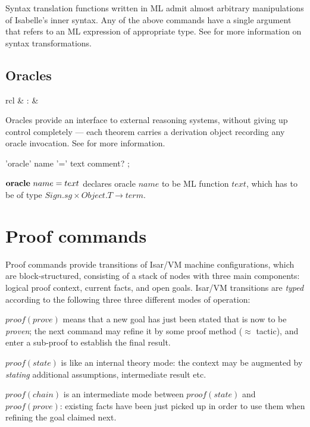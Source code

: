 Syntax translation functions written in ML admit almost arbitrary
manipulations of Isabelle's inner syntax.  Any of the above commands have a
single  argument that refers to an ML expression of
appropriate type.  See \cite[\S8]{isabelle-ref} for more information on syntax
transformations.


\subsection{Oracles}

\begin{matharray}{rcl}
   & : &  \\
\end{matharray}

Oracles provide an interface to external reasoning systems, without giving up
control completely --- each theorem carries a derivation object recording any
oracle invocation.  See \cite[\S6]{isabelle-ref} for more information.

\begin{rail}
  'oracle' name '=' text comment?
  ;
\end{rail}

\begin{descr}
\item [${\mathord{\mathbf{oracle}}}~name=text$] declares oracle $name$ to be ML
  function $text$, which has to be of type $Sign\mathord.sg \times
  Object\mathord.T \to term$.
\end{descr}


\section{Proof commands}

Proof commands provide transitions of Isar/VM machine configurations, which
are block-structured, consisting of a stack of nodes with three main
components: logical proof context, current facts, and open goals.  Isar/VM
transitions are \emph{typed} according to the following three three different
modes of operation:
\begin{descr}
\item [$proof(prove)$] means that a new goal has just been stated that is now
  to be \emph{proven}; the next command may refine it by some proof method
  ($\approx$ tactic), and enter a sub-proof to establish the final result.
\item [$proof(state)$] is like an internal theory mode: the context may be
  augmented by \emph{stating} additional assumptions, intermediate result etc.
\item [$proof(chain)$] is an intermediate mode between $proof(state)$ and
  $proof(prove)$: existing facts have been just picked up in order to use them
  when refining the goal claimed next.
\end{descr}



